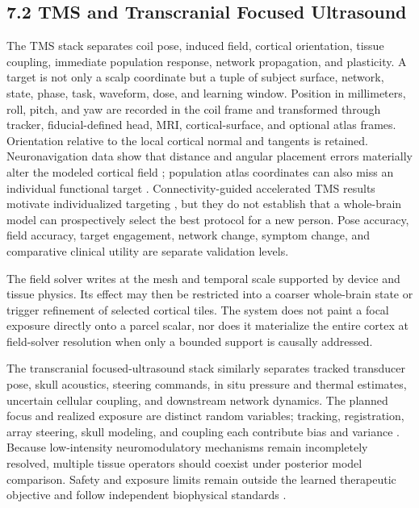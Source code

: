 \subsection{7.2 TMS and Transcranial Focused Ultrasound}

The TMS stack separates coil pose, induced field, cortical orientation,
tissue coupling, immediate population response, network propagation, and
plasticity. A target is not only a scalp coordinate but a tuple of subject
surface, network, state, phase, task, waveform, dose, and learning window.
Position in millimeters, roll, pitch, and yaw are recorded in the coil frame
and transformed through tracker, fiducial-defined head, MRI, cortical-surface,
and optional atlas frames. Orientation relative to the local cortical normal
and tangents is retained. Neuronavigation data show that distance and angular
placement errors materially alter the modeled cortical field
\citep{caulfield2022}; population atlas coordinates can also miss an
individual functional target \citep{uehara2024}. Connectivity-guided
accelerated TMS results motivate individualized targeting \citep{cole2020},
but they do not establish that a whole-brain model can prospectively select
the best protocol for a new person. Pose accuracy, field accuracy, target
engagement, network change, symptom change, and comparative clinical utility
are separate validation levels.

The field solver writes at the mesh and temporal scale supported by device and
tissue physics. Its effect may then be restricted into a coarser whole-brain
state or trigger refinement of selected cortical tiles. The system does not
paint a focal exposure directly onto a parcel scalar, nor does it materialize
the entire cortex at field-solver resolution when only a bounded support is
causally addressed.

The transcranial focused-ultrasound stack similarly separates tracked
transducer pose, skull acoustics, steering commands, in situ pressure and
thermal estimates, uncertain cellular coupling, and downstream network
dynamics. The planned focus and realized exposure are distinct random
variables; tracking, registration, array steering, skull modeling, and
coupling each contribute bias and variance \citep{phipps2024}. Because
low-intensity neuromodulatory mechanisms remain incompletely resolved,
multiple tissue operators should coexist under posterior model comparison.
Safety and exposure limits remain outside the learned therapeutic objective
and follow independent biophysical standards \citep{aubry2025}.

